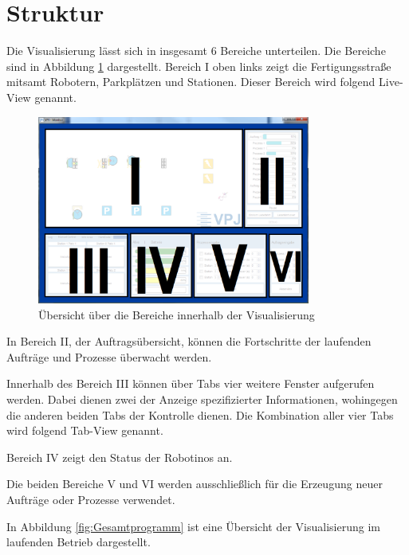 \section{Struktur}

Die Visualisierung lässt sich in insgesamt 6 Bereiche unterteilen. Die Bereiche sind in Abbildung \ref{fig:GesamtprogrammBereiche} dargestellt. Bereich I oben links zeigt die Fertigungsstraße mitsamt Robotern, Parkplätzen und Stationen. Dieser Bereich wird folgend Live-View genannt. 

\begin{figure}[htb]
    \centering
    \includegraphics[width=0.8\textwidth]{Abbildungen/GesamtprogrammBereiche.png}
    \caption{Übersicht über die Bereiche innerhalb der Visualisierung}		
    \label{fig:GesamtprogrammBereiche}
\end{figure}

In Bereich II, der Auftragsübersicht, können die Fortschritte der laufenden Aufträge und Prozesse überwacht werden.

Innerhalb des Bereich III können über Tabs vier weitere Fenster aufgerufen werden. Dabei dienen zwei der Anzeige spezifizierter Informationen, wohingegen die anderen beiden Tabs der Kontrolle dienen. Die Kombination aller vier Tabs wird folgend Tab-View genannt.

Bereich IV zeigt den Status der Robotinos an. 

Die beiden Bereiche V und VI werden ausschließlich für die Erzeugung neuer Aufträge oder Prozesse verwendet. 

In Abbildung \ref{fig:Gesamtprogramm} ist eine Übersicht der Visualisierung im laufenden Betrieb dargestellt. 

